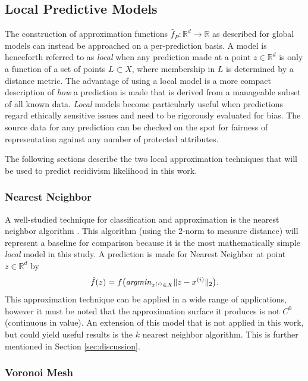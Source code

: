 \documentclass[conference]{IEEEtran}
\begin{document}
\subsection{Local Predictive Models}

The construction of approximation functions $\hat f_P: \mathbb{R}^d \rightarrow \mathbb{R}$ as described for global models can instead be approached on a per-prediction basis. A model is henceforth referred to as \textit{local} when any prediction made at a point $z \in \mathbb{R}^d$ is only a function of a set of points $L \subset X$, where membership in $L$ is determined by a distance metric. The advantage of using a local model is a more compact description of \textit{how} a prediction is made that is derived from a manageable subset of all known data. \textit{Local} models become particularly useful when predictions regard ethically sensitive issues and need to be rigorously evaluated for bias. The source data for any prediction can be checked on the spot for fairness of representation against any number of protected attributes.

The following sections describe the two local approximation techniques that will be used to predict recidivism likelihood in this work.

\subsubsection{Nearest Neighbor}

A well-studied technique for classification and approximation is the nearest neighbor algorithm \cite{cover1967nearest}. This algorithm (using the 2-norm to measure distance) will represent a baseline for comparison because it is the most mathematically simple \textit{local} model in this study. A prediction is made for Nearest Neighbor at point $z \in \mathbb{R}^d$ by
$$ \hat f(z) = f \big ( \text{\textit{argmin}}_{x^{(i)} \in X} \| z - x^{(i)} \|_2 \big). $$
This approximation technique can be applied in a wide range of applications, however it must be noted that the approximation surface it produces is not $C^0$ (continuous in value). An extension of this model that is not applied in this work, but could yield useful results is the $k$ nearest neighbor algorithm. This is further mentioned in Section \ref{sec:discussion}.

\subsubsection{Voronoi Mesh}
\end{document}
